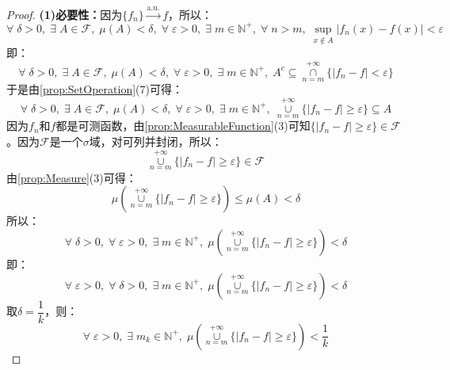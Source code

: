 \begin{proof}
	\textbf{(1)必要性：}因为$\{f_n\}\overset{\text{a.u.}}{\longrightarrow}f$，所以：
	\begin{equation*}
		\forall\;\delta>0,\;\exists\;A\in \mathscr{F},\;\mu(A)<\delta,\;\forall\;\varepsilon>0,\;\exists\;m\in \mathbb{N}^+,\;\forall\;n>m,\;\sup_{x\notin A}|f_n(x)-f(x)|<\varepsilon
	\end{equation*}
	即：
	\begin{equation*}
		\forall\;\delta>0,\;\exists\;A\in \mathscr{F},\;\mu(A)<\delta,\;\forall\;\varepsilon>0,\;\exists\;m\in\mathbb{N}^+,\;A^c\subseteq\underset{n=m}{\overset{+\infty}{\cap}}\{|f_n-f|<\varepsilon\}
	\end{equation*}
	于是由\cref{prop:SetOperation}(7)可得：
	\begin{equation*}
		\forall\;\delta>0,\;\exists\;A\in \mathscr{F},\;\mu(A)<\delta,\;\forall\;\varepsilon>0,\;\exists\;m\in\mathbb{N}^+,\;\underset{n=m}{\overset{+\infty}{\cup}}\{|f_n-f|\geqslant\varepsilon\}\subseteq A
	\end{equation*}
	因为$f_n$和$f$都是可测函数，由\cref{prop:MeasurableFunction}(3)可知$\{|f_n-f|\geqslant\varepsilon\}\in \mathscr{F}$。因为$\mathscr{F}$是一个$\sigma$域，对可列并封闭，所以：
	\begin{equation*}
		\underset{n=m}{\overset{+\infty}{\cup}}\{|f_n-f|\geqslant\varepsilon\}\in \mathscr{F}
	\end{equation*}
	由\cref{prop:Measure}(3)可得：
	\begin{equation*}
		\mu\left(\underset{n=m}{\overset{+\infty}{\cup}}\{|f_n-f|\geqslant\varepsilon\}\right)\leqslant\mu(A)<\delta
	\end{equation*}
	所以：
	\begin{equation*}
		\forall\;\delta>0,\;\forall\;\varepsilon>0,\;\exists\;m\in\mathbb{N}^+,\;\mu\left(\underset{n=m}{\overset{+\infty}{\cup}}\{|f_n-f|\geqslant\varepsilon\}\right)<\delta
	\end{equation*}
	即：
	\begin{equation*}
		\forall\;\varepsilon>0,\;\forall\;\delta>0,\;\exists\;m\in\mathbb{N}^+,\;\mu\left(\underset{n=m}{\overset{+\infty}{\cup}}\{|f_n-f|\geqslant\varepsilon\}\right)<\delta
	\end{equation*}
	取$\delta=\dfrac{1}{k}$，则：
	\begin{equation*}
		\forall\;\varepsilon>0,\;\exists\;m_k\in\mathbb{N}^+,\;\mu\left(\underset{n=m}{\overset{+\infty}{\cup}}\{|f_n-f|\geqslant\varepsilon\}\right)<\frac{1}{k}
	\end{equation*}

\end{proof}

